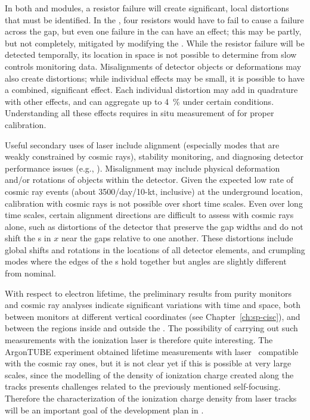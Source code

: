 In both \single and \dual modules, %
a resistor failure will create significant, local \efield distortions that must be identified. In the , %
four resistors would have to fail to cause a failure across the  gap, but even one failure in the  can have an effect; this may be partly, but not completely, mitigated by modifying the . While the resistor failure will be detected temporally, its location in space is not possible to determine from slow controls monitoring data. Misalignments of detector objects or deformations may also create \efield distortions; while individual effects may be small, it is possible to have a combined, significant effect.
Each individual \efield distortion may add in quadrature with other effects, and can aggregate up to \SI{4}{\%} under certain conditions. Understanding all these effects requires in situ  measurement of \efield for proper calibration. 

Useful secondary uses of laser include alignment (especially modes that are weakly constrained by cosmic rays),
stability monitoring, and diagnosing detector performance issues
(e.g., ).  
Misalignment may include physical deformation and/or rotations of objects within the detector. Given the expected low rate of cosmic ray events (about 3500/day/10-kt, inclusive) at the underground location, calibration with cosmic rays is not possible over short time scales. Even over long time scales, certain alignment directions  are difficult to assess with cosmic rays alone, such as distortions of the detector that preserve the gap widths and do not shift the s in $x$ near the gaps relative to one another.
These distortions include global shifts and rotations in the locations of all detector elements, and crumpling modes where the edges of the s hold together but angles are slightly different from nominal.   

With respect to electron lifetime, the preliminary results from  purity monitors and cosmic ray analyses indicate significant variations with time and space, both between monitors at different vertical coordinates (see Chapter~\ref{ch:sp-cisc}), and between the regions inside and outside the . The possibility of carrying out such measurements with the ionization laser is therefore quite interesting. The ArgonTUBE experiment obtained lifetime measurements with laser~\cite{Ereditato:2013xaa} compatible with the cosmic ray ones, but it is not clear yet if this is possible at very large scales, since the modelling of the density of ionization charge created along the tracks presents challenges related to the previously mentioned self-focusing. Therefore the characterization of the ionization charge density from laser tracks will be an important goal of the development plan in .


